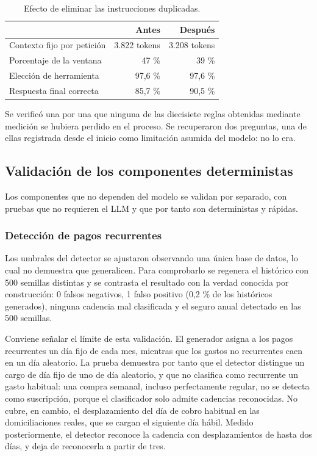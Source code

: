 \begin{table}[h]
\centering
\begin{tabular}{lrr}
\toprule
 & \textbf{Antes} & \textbf{Después} \\
\midrule
Contexto fijo por petición   & 3.822 tokens & 3.208 tokens \\
Porcentaje de la ventana     & 47 \%        & 39 \% \\
Elección de herramienta      & 97,6 \%      & 97,6 \% \\
Respuesta final correcta     & 85,7 \%      & 90,5 \% \\
\bottomrule
\end{tabular}
\caption{Efecto de eliminar las instrucciones duplicadas.}
\end{table}

Se verificó una por una que ninguna de las diecisiete reglas obtenidas mediante
medición se hubiera perdido en el proceso. Se recuperaron dos preguntas, una de
ellas registrada desde el inicio como limitación asumida del modelo: no lo era.

\subsection{Validación de los componentes deterministas}

Los componentes que no dependen del modelo se validan por separado, con pruebas
que no requieren el LLM y que por tanto son deterministas y rápidas.

\subsubsection{Detección de pagos recurrentes}

Los umbrales del detector se ajustaron observando una única base de datos, lo
cual no demuestra que generalicen. Para comprobarlo se regenera el histórico con
500 semillas distintas y se contrasta el resultado con la verdad conocida por
construcción: 0 falsos negativos, 1 falso positivo (0,2 \% de los históricos
generados), ninguna cadencia mal clasificada y el seguro anual detectado en las
500 semillas.

Conviene señalar el límite de esta validación. El generador asigna a los pagos
recurrentes un día fijo de cada mes, mientras que los gastos no recurrentes caen
en un día aleatorio. La prueba demuestra por tanto que el detector distingue un
cargo de día fijo de uno de día aleatorio, y que no clasifica como recurrente un
gasto habitual: una compra semanal, incluso perfectamente regular, no se detecta
como suscripción, porque el clasificador solo admite cadencias reconocidas. No
cubre, en cambio, el desplazamiento del día de cobro habitual en las
domiciliaciones reales, que se cargan el siguiente día hábil. Medido
posteriormente, el detector reconoce la cadencia con desplazamientos de hasta
dos días, y deja de reconocerla a partir de tres.

